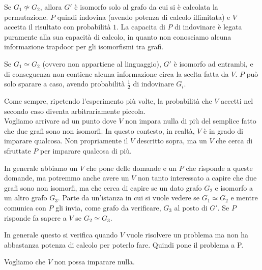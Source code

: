 \noindent Se $G_1 \not\simeq G_2$, allora $G'$ è isomorfo solo al grafo da cui si è calcolata la permutazione. $P$ quindi indovina (avendo potenza di calcolo illimitata) e $V$ accetta il risultato con probabilità $1$. La capacita di $P$ di indovinare è legata puramente alla sua capacità di calcolo, in quanto non conosciamo alcuna informazione trapdoor per gli isomorfismi tra grafi. 
    
Se $G_1 \simeq G_2$ (ovvero non appartiene al linguaggio), $G'$ è isomorfo ad entrambi, e di conseguenza non contiene alcuna informazione circa la scelta fatta da $V$. $P$ può solo sparare a caso, avendo probabilità $\frac{1}{2}$ di indovinare $G_i$. 

Come sempre, ripetendo l'esperimento più volte, la probabilità che $V$ accetti nel secondo caso diventa arbitrariamente piccola. 
\\

\noindent Vogliamo arrivare ad un punto dove $V$ non impara nulla di più del semplice fatto che due grafi sono non isomorfi. In questo contesto, in realtà, $V$ è in grado di imparare qualcosa. Non propriamente il $V$ descritto sopra, ma un $V$ che cerca di sfruttate $P$ per imparare qualcosa di più. 

In generale abbiamo un $V$ che pone delle domande e un $P$ che risponde a queste domande, ma potremmo anche avere un $V$ non tanto interessato a capire che due grafi sono non isomorfi, ma che cerca di capire se un dato grafo $G_2$ e isomorfo a un altro grafo $G_3$. Parte da un'istanza in cui si vuole vedere se $G_1 \simeq G_2$ e mentre comunica con $P$ gli invia, come grafo da verificare, $G_3$ al posto di $G'$. Se $P$ risponde fa sapere a $V$ se $G_2 \simeq G_3$.

In generale questo si verifica quando $V$ vuole risolvere un problema ma non ha abbastanza potenza di calcolo per poterlo fare. Quindi pone il problema a P.

Vogliamo che $V$ non possa imparare nulla.
\\



